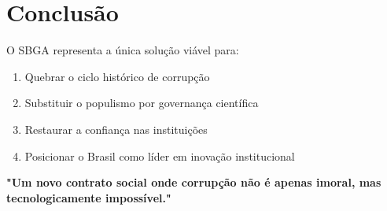 \documentclass[12pt, a4paper]{article}
\begin{document}
\section{Conclusão}
O SBGA representa a única solução viável para:
\begin{enumerate}
    \item Quebrar o ciclo histórico de corrupção
    \item Substituir o populismo por governança científica
    \item Restaurar a confiança nas instituições
    \item Posicionar o Brasil como líder em inovação institucional
\end{enumerate}

\textbf{"Um novo contrato social onde corrupção não é apenas imoral, mas tecnologicamente impossível."}
\end{document}
